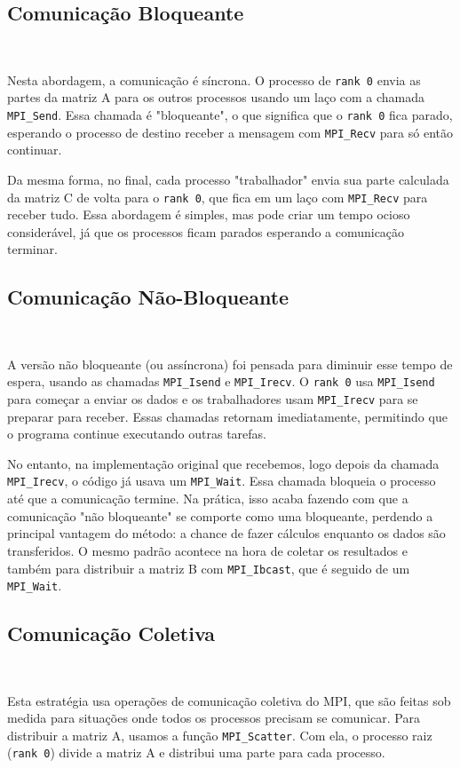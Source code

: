 \documentclass{article}
\begin{document}
\subsection{Comunicação Bloqueante}
\

Nesta abordagem, a comunicação é síncrona. O processo de \texttt{rank 0} envia as partes da matriz A para os outros processos usando um laço com a chamada \texttt{MPI\_Send}. Essa chamada é "bloqueante", o que significa que o \texttt{rank 0} fica parado, esperando o processo de destino receber a mensagem com \texttt{MPI\_Recv} para só então continuar.

Da mesma forma, no final, cada processo "trabalhador" envia sua parte calculada da matriz C de volta para o \texttt{rank 0}, que fica em um laço com \texttt{MPI\_Recv} para receber tudo. Essa abordagem é simples, mas pode criar um tempo ocioso considerável, já que os processos ficam parados esperando a comunicação terminar.

\subsection{Comunicação Não-Bloqueante}
\

A versão não bloqueante (ou assíncrona) foi pensada para diminuir esse tempo de espera, usando as chamadas \texttt{MPI\_Isend} e \texttt{MPI\_Irecv}. O \texttt{rank 0} usa \texttt{MPI\_Isend} para começar a enviar os dados e os trabalhadores usam \texttt{MPI\_Irecv} para se preparar para receber. Essas chamadas retornam imediatamente, permitindo que o programa continue executando outras tarefas.

No entanto, na implementação original que recebemos, logo depois da chamada \texttt{MPI\_Irecv}, o código já usava um \texttt{MPI\_Wait}. Essa chamada bloqueia o processo até que a comunicação termine. Na prática, isso acaba fazendo com que a comunicação "não bloqueante" se comporte como uma bloqueante, perdendo a principal vantagem do método: a chance de fazer cálculos enquanto os dados são transferidos. O mesmo padrão acontece na hora de coletar os resultados e também para distribuir a matriz B com \texttt{MPI\_Ibcast}, que é seguido de um \texttt{MPI\_Wait}.

\subsection{Comunicação Coletiva}
\

Esta estratégia usa operações de comunicação coletiva do MPI, que são feitas sob medida para situações onde todos os processos precisam se comunicar. Para distribuir a matriz A, usamos a função \texttt{MPI\_Scatter}. Com ela, o processo raiz (\texttt{rank 0}) divide a matriz A e distribui uma parte para cada processo.
\end{document}
